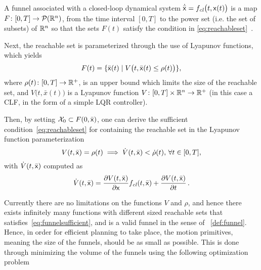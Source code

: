 \begin{definition}
  \label{def:funnel}
  A funnel associated with a closed-loop dynamical system \(\dot{\bar{{\mathbf{\mathsf{x}}}}}
  = f_{\mathit{cl}}\big( t,{\mathbf{\mathsf{x}}}(t) \big) \) is a map \(F \colon [0,T]
  \rightarrow \mathcal{P}(\mathbb{R}^n)\), from the time interval \([0,T]\) to the power
  set (i.e. the set of subsets) of \(\mathbb{R}^n\) so that the sets \(F(t)\) satisfy
  the
  condition in \cref{eq:reachableset}~\cite{majumdarFunnelLibrariesRealtime2017}.
\end{definition}

Next, the reachable set is parameterized through the use of Lyapunov functions,
which yields
\begin{equation}
  F(t) = \lbrace\bar{{\mathbf{\mathsf{x}}}}(t) \mid V \big(t, \bar{{\mathbf{\mathsf{x}}}}(t) \leq \rho (t) \big)\rbrace,
\end{equation}
where \(\rho (t) \colon [0,T] \rightarrow \mathbb{R}^+\), is an upper bound which limits
the size of the reachable set, and \(V \big(t,\bar{x}(t) \big)\) is a Lyapunov
function \(V \colon [0,T] \times \mathbb{R}^n \rightarrow \mathbb{R}^+\) (in this case a
\ac{CLF}, in the form of a simple \ac{LQR} controller).

Then, by setting \(\mathcal{X}_0 \subset F(0,\bar{{\mathbf{\mathsf{x}}}})\), one can derive
the sufficient condition~\cref{eq:reachableset} for containing the reachable set
in the Lyapunov function parameterization
\begin{equation}
  \label{eq:funnelsufficient}
  V(t,\bar{{\mathbf{\mathsf{x}}}}) = \rho(t) \implies \dot{V}(t,\bar{{\mathbf{\mathsf{x}}}}) < \dot{\rho}(t), \, \forall t \in [0,T], 
\end{equation}
with \(\dot{V}(t,\bar{{\mathbf{\mathsf{x}}}})\) computed as
\begin{equation}
  \dot{V}(t,\bar{{\mathbf{\mathsf{x}}}}) = \frac{\partial V(t,\bar{{\mathbf{\mathsf{x}}}})}{\partial {\mathbf{\mathsf{x}}}} f_{\mathit{cl}}(t,\bar{{\mathbf{\mathsf{x}}}}) + \frac{\partial V(t,\bar{{\mathbf{\mathsf{x}}}})}{\partial t} \, .
\end{equation}

Currently there are no limitations on the functions \(V\) and \(\rho\), and
hence there exists infinitely many functions with different sized reachable sets
that satisfies~\cref{eq:funnelsufficient}, and is a valid funnel in the sense of
~\cref{def:funnel}. Hence, in order for efficient planning to take place, the
motion primitives, meaning the size of the funnels, should be as small as
possible. This is done through minimizing the volume of the funnels using the
following optimization problem

